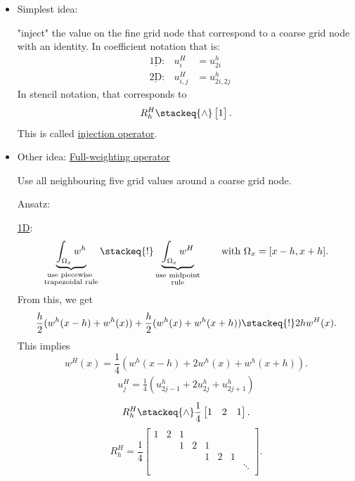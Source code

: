 \begin{itemize}
	\item Simplest idea:

		"inject" the value on the fine grid node that correspond to a coarse grid node with an identity. In coefficient notation that is:
		\begin{align*}
			&\underline{\text{1D}}:& u_{i}^{H} &= u_{2i}^{h} \\
			&\underline{\text{2D}}:& u_{i,j}^{H} &= u_{2i, 2j}^{h}
		\end{align*}
		In stencil notation, that corresponds to
		\[
			R_{h}^{H} \stackeq{\wedge} \begin{bmatrix}
				1
			\end{bmatrix}
		.\] 
		This is called \underline{injection operator}. 

	\item Other idea: \underline{Full-weighting operator} 

		Use all neighbouring five grid values around a coarse grid node.

		Ansatz:

		\underline{1D}:
		\[
			\underbrace{\int_{\Omega_{x}}w^{h}}_{\substack{\text{use
			piecewise }\\\text{trapezoidal rule}}}
			\stackeq{!}
			\underbrace{\int_{\Omega_{x}}w^{H}}_{\substack{\text{use
			midpoint}\\\text{rule}}} \qquad \text{with }
			\Omega_{x} = [x-h, x+h]  
		.\] 
		From this, we get
		\[
			\frac{h}{2}(w^{h}(x-h) + w^{h}(x)) + \frac{h}{2}(w^{h}(x) + w^{h}(x+h)) \stackeq{!} 2hw^{H}(x) \\
		.\] 
		This implies
		\[
			w^{H}(x) = \frac{1}{4}(w^{h}(x-h)+2w^{h}(x) + w^{h}(x+h))
		.\] 
		\begin{align*}
			u_{j}^{H}= \frac{1}{4}(u_{2j-1}^{h}+2u_{2j}^{h}+ u_{2j+1}^{h})
		\end{align*}
		\[
			R_{h}^{H}\stackeq{\wedge}\frac{1}{4}\begin{bmatrix}
				1 & 2 & 1
			\end{bmatrix}
		.\] 
		\[
			R_{h}^{H}= \frac{1}{4}\begin{bmatrix}
				1 & 2 & 1 \\
				  &   & 1 & 2 & 1 \\
				  &   &   &   & 1 & 2 & 1 \\
				  &   &   &   &   &   &   & \ddots \\
			\end{bmatrix}
		.\] 


\end{itemize}

